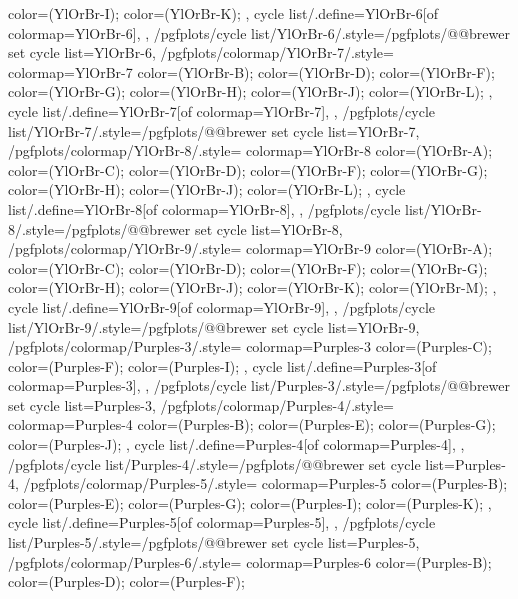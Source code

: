 {{{      color=(YlOrBr-I);
      color=(YlOrBr-K);
    },
    cycle list/.define={YlOrBr-6}{[of colormap=YlOrBr-6]},
  },
  /pgfplots/cycle list/YlOrBr-6/.style={/pgfplots/@@brewer set cycle list={YlOrBr-6}},
  /pgfplots/colormap/YlOrBr-7/.style={
    colormap={YlOrBr-7}{
      color=(YlOrBr-B);
      color=(YlOrBr-D);
      color=(YlOrBr-F);
      color=(YlOrBr-G);
      color=(YlOrBr-H);
      color=(YlOrBr-J);
      color=(YlOrBr-L);
    },
    cycle list/.define={YlOrBr-7}{[of colormap=YlOrBr-7]},
  },
  /pgfplots/cycle list/YlOrBr-7/.style={/pgfplots/@@brewer set cycle list={YlOrBr-7}},
  /pgfplots/colormap/YlOrBr-8/.style={
    colormap={YlOrBr-8}{
      color=(YlOrBr-A);
      color=(YlOrBr-C);
      color=(YlOrBr-D);
      color=(YlOrBr-F);
      color=(YlOrBr-G);
      color=(YlOrBr-H);
      color=(YlOrBr-J);
      color=(YlOrBr-L);
    },
    cycle list/.define={YlOrBr-8}{[of colormap=YlOrBr-8]},
  },
  /pgfplots/cycle list/YlOrBr-8/.style={/pgfplots/@@brewer set cycle list={YlOrBr-8}},
  /pgfplots/colormap/YlOrBr-9/.style={
    colormap={YlOrBr-9}{
      color=(YlOrBr-A);
      color=(YlOrBr-C);
      color=(YlOrBr-D);
      color=(YlOrBr-F);
      color=(YlOrBr-G);
      color=(YlOrBr-H);
      color=(YlOrBr-J);
      color=(YlOrBr-K);
      color=(YlOrBr-M);
    },
    cycle list/.define={YlOrBr-9}{[of colormap=YlOrBr-9]},
  },
  /pgfplots/cycle list/YlOrBr-9/.style={/pgfplots/@@brewer set cycle list={YlOrBr-9}},
  /pgfplots/colormap/Purples-3/.style={
    colormap={Purples-3}{
      color=(Purples-C);
      color=(Purples-F);
      color=(Purples-I);
    },
    cycle list/.define={Purples-3}{[of colormap=Purples-3]},
  },
  /pgfplots/cycle list/Purples-3/.style={/pgfplots/@@brewer set cycle list={Purples-3}},
  /pgfplots/colormap/Purples-4/.style={
    colormap={Purples-4}{
      color=(Purples-B);
      color=(Purples-E);
      color=(Purples-G);
      color=(Purples-J);
    },
    cycle list/.define={Purples-4}{[of colormap=Purples-4]},
  },
  /pgfplots/cycle list/Purples-4/.style={/pgfplots/@@brewer set cycle list={Purples-4}},
  /pgfplots/colormap/Purples-5/.style={
    colormap={Purples-5}{
      color=(Purples-B);
      color=(Purples-E);
      color=(Purples-G);
      color=(Purples-I);
      color=(Purples-K);
    },
    cycle list/.define={Purples-5}{[of colormap=Purples-5]},
  },
  /pgfplots/cycle list/Purples-5/.style={/pgfplots/@@brewer set cycle list={Purples-5}},
  /pgfplots/colormap/Purples-6/.style={
    colormap={Purples-6}{
      color=(Purples-B);
      color=(Purples-D);
      color=(Purples-F);
}}}
